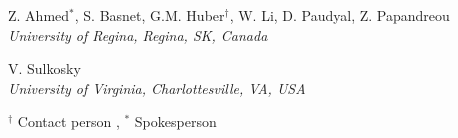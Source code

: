 \documentclass{article}
\begin{document}
\begin{center}
Z. Ahmed$^\ast$, S. Basnet, G.M. Huber$^\dagger$, W. Li, D. Paudyal, Z. Papandreou\\
\vspace*{5pt}
{\it University of Regina, Regina, SK, Canada}
\vspace*{20pt}

V. Sulkosky  \\
\vspace*{5pt}
{\it University of Virginia, Charlottesville, VA, USA}
\vspace*{20pt}

\end{center}

$^\dagger$ Contact person , $^\ast$ Spokesperson

\vfill\eject

\clearpage



\newpage

\tableofcontents
\end{document}
